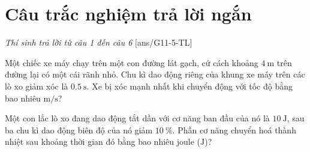 \section{Câu trắc nghiệm trả lời ngắn} \textit{Thí sinh trả lời từ câu 1 đến câu 6}
\setcounter{ex}{0}
[ans/G11-5-TL]
\begin{ex}
	Một chiếc xe máy chạy trên một con đường lát gạch, cứ cách khoảng $\SI{4}{\meter}$ trên đường lại có một cái rãnh nhỏ. Chu kì dao động riêng của khung xe máy trên các lò xo giảm xóc là $\SI{0.5}{\second}$. Xe bị xóc mạnh nhất khi chuyển động với tốc độ bằng bao nhiêu $\si{\meter/\second}$?
\end{ex}
\begin{ex}
Một con lắc lò xo đang dao động tắt dần với cơ năng ban đầu của nó là $\SI{10}{\joule}$, sau ba chu kì dao động biên độ của nó giảm $\SI{10}{\percent}$. Phần cơ năng chuyển hoá thành nhiệt sau khoảng thời gian đó bằng bao nhiêu joule ($\si{\joule}$)?	
\end{ex}
